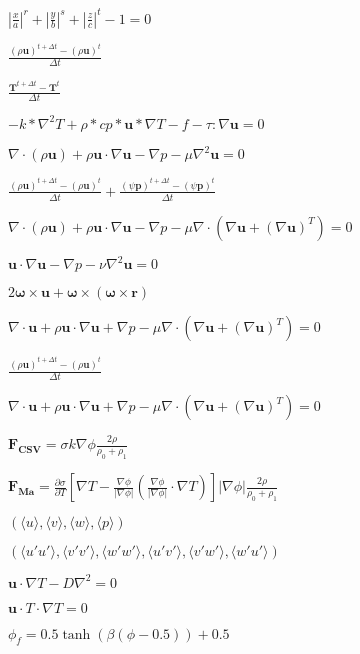 \documentclass{article}
\begin{document}
$ \left|\frac{x}{a}\right|^r + \left|\frac{y}{b}\right|^s + \left|\frac{z}{c}\right|^t - 1 = 0 $
\pagebreak

$\frac{(\rho \mathbf{u})^{t+\Delta t}-(\rho \mathbf{u})^{t}}{\Delta t}$
\pagebreak

$\frac{\mathbf{T}^{t+\Delta t}-\mathbf{T}^{t}}{\Delta t}$
\pagebreak

$ - k * \nabla^2 T + \rho * cp * \mathbf{u} * \nabla T - f - \tau : \nabla \mathbf{u} =0 $
\pagebreak

$\nabla \cdot (\rho \mathbf{u}) + \rho \mathbf{u} \cdot \nabla \mathbf{u} - \nabla p - \mu \nabla^2 \mathbf{u} = 0$
\pagebreak

$\frac{(\rho \mathbf{u})^{t+\Delta t}-(\rho \mathbf{u})^{t}}{\Delta t} + \frac{(\psi \mathbf{p})^{t+\Delta t}-(\psi \mathbf{p})^{t}}{\Delta t} $
\pagebreak

$\nabla \cdot (\rho \mathbf{u}) + \rho \mathbf{u} \cdot \nabla \mathbf{u} - \nabla p - \mu \nabla\cdot (\nabla \mathbf{u} + (\nabla \mathbf{u})^T) = 0 $
\pagebreak

$\mathbf{u} \cdot \nabla \mathbf{u} - \nabla p - \nu \nabla^2 \mathbf{u} =0 $
\pagebreak

$2\mathbf{\omega} \times \mathbf{u} + \mathbf{\omega}\times (\mathbf{\omega} \times \mathbf{r})$
\pagebreak

$ \nabla \cdot \mathbf{u} + \rho \mathbf{u} \cdot \nabla \mathbf{u} + \nabla p - \mu \nabla\cdot (\nabla \mathbf{u} + (\nabla \mathbf{u})^T)=0 $
\pagebreak

$\frac{(\rho \mathbf{u})^{t+\Delta t}-(\rho \mathbf{u})^{t}}{\Delta t} $
\pagebreak

$ \nabla \cdot \mathbf{u} + \rho \mathbf{u} \cdot \nabla \mathbf{u} + \nabla p - \mu \nabla\cdot (\nabla \mathbf{u} + (\nabla \mathbf{u})^T) = 0 $
\pagebreak

$\mathbf{F_{CSV}}=\sigma k \nabla \phi \frac{2 \rho}{\rho_0 + \rho_1} $
\pagebreak

$\mathbf{F_{Ma}}= \frac{\partial \sigma}{\partial T} \left[ \nabla T - \frac{\nabla \phi}{| \nabla \phi |} \left( \frac{ \nabla \phi } {| \nabla \phi |} \cdot \nabla T \right) \right] | \nabla \phi | \frac{2 \rho}{\rho_0 + \rho_1} $
\pagebreak

$(\langle u \rangle, \langle v \rangle, \langle w \rangle, \langle p \rangle)$
\pagebreak

$(\langle u'u' \rangle, \langle v'v' \rangle, \langle w'w' \rangle, \langle u'v' \rangle, \langle v'w' \rangle, \langle w'u' \rangle)$
\pagebreak

$\mathbf{u} \cdot \nabla T - D \nabla^2 =0 $
\pagebreak

$\mathbf{u} \cdot T \cdot \nabla T =0 $
\pagebreak

$\phi_f = 0.5 \tanh(\beta(\phi-0.5)) + 0.5$
\pagebreak
\end{document}
